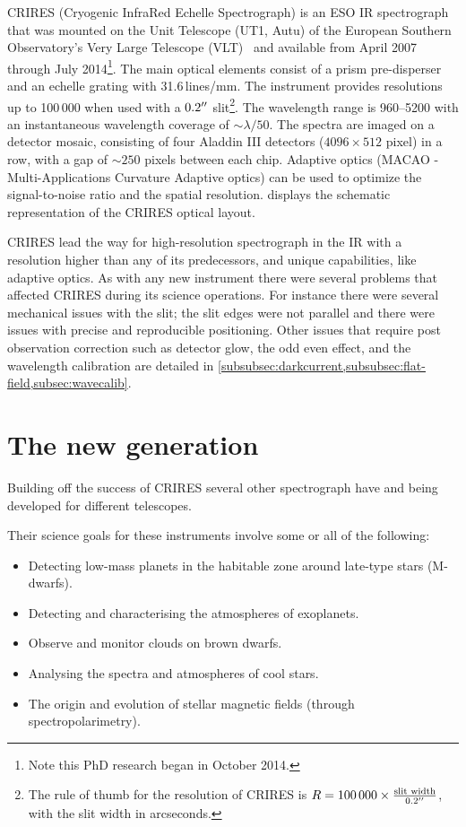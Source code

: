 CRIRES (Cryogenic InfraRed Echelle Spectrograph) is an {ESO} {IR} spectrograph that was mounted on the Unit Telescope (UT1, Autu) of the European Southern Observatory's Very Large Telescope (VLT)~\citep{kaeufl_crires_2004} and available from April 2007 through July 2014\footnote{Note this PhD research began in October 2014.}.
The main optical elements consist of a prism pre-disperser and an echelle grating with 31.6\,lines/mm.
The instrument provides resolutions up to 100\,000 when used with a $0.2^{\prime\prime}$ slit\footnote{The rule of thumb for the resolution of {CRIRES} is \(R=100\,000 \times \frac{\textrm{slit width}}{0.2^{\prime\prime}}\), with the slit width in arcseconds.}.
The wavelength range is 960--5200\nm{} with an instantaneous wavelength coverage of \(\sim\lambda/50\).
The spectra are imaged on a detector mosaic, consisting of four Aladdin III detectors (\(4096 \times 512\) pixel) in a row, with a gap of \(\sim250\) pixels between each chip.
Adaptive optics (MACAO - Multi-Applications Curvature Adaptive optics) can be used to optimize the signal-to-noise ratio and the spatial resolution.
 displays the schematic representation of the {CRIRES} optical layout.

CRIRES lead the way for high-resolution spectrograph in the {IR} with a resolution higher than any of its predecessors, and unique capabilities, like adaptive optics.
As with any new instrument there were several problems that affected {CRIRES} during its science operations.
For instance there were several mechanical issues with the slit; the slit edges were not parallel and there were issues with precise and reproducible positioning.
Other issues that require post observation correction such as detector glow, the odd even effect, and the wavelength calibration are detailed in \cref{subsubsec:darkcurrent,subsubsec:flat-field,subsec:wavecalib}.


\section{The new generation}
\label{subsec:new_generation}
Building off the success of {CRIRES} several other \nir{} spectrograph have and being developed for different telescopes.

Their science goals for these instruments involve some or all of the following:

\begin{itemize}
\item Detecting low-mass planets in the habitable zone around late-type stars (M-dwarfs).
\item Detecting and characterising the atmospheres of exoplanets.
\item Observe and monitor clouds on brown dwarfs.
\item Analysing the spectra and atmospheres of cool stars.
\item The origin and evolution of stellar magnetic fields (through spectropolarimetry).
\end{itemize}

